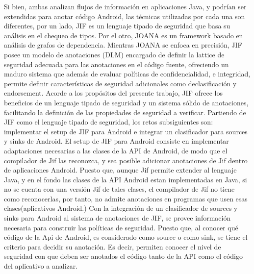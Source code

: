 Si bien, ambas analizan flujos de información en aplicaciones Java, y
podrían ser extendidas para anotar código Android, las técnicas utilizadas por cada una
son diferentes, por un lado, JIF es un lenguaje tipado de seguridad que basa su
análisis en el chequeo de tipos. Por el otro, JOANA es un framework basado en
análisis de grafos de dependencia. Mientras JOANA se enfoca en precisión, JIF
posee un modelo de anotaciones (DLM) encargado de definir la lattice de
seguridad adecuada para las anotaciones en el código fuente, ofreciendo un
maduro sistema que además de evaluar políticas de confidencialidad, e
integridad, permite definir características de seguridad adicionales como
declasificación y endorsement.
Acorde a los propósitos del presente trabajo, JIF ofrece los beneficios de un
lenguaje tipado de seguridad y un sistema  sólido  de anotaciones, facilitando
la definición de las propiedades de seguridad a verificar.\newline 
Partiendo de JIF como el lenguaje tipado de seguridad, los retos subsiguientes
son: implementar el setup de JIF para Android e integrar un clasificador
para sources y sinks de Android. 
El setup de JIF para Android consiste en implementar adaptaciones necesarias
a las clases de la API de Android, de modo que el compilador de Jif las
reconozca, y sea posible adicionar anotaciones de Jif dentro de aplicaciones
Android. Puesto que, aunque Jif permite extender al lenguaje Java, y en el fondo
las clases de la API Android estan implementadas en Java, si no se cuenta con
una versión Jif de tales clases, el compilador de Jif no tiene como
reconocerlas, por tanto, no admite anotaciones en programas que usen esas
clases(aplicativos Android.)\newline
Con la integración de un clasificador de sources y sinks para Android al sistema
de anotaciones de JIF, se provee información necesaria para construir las
políticas de seguridad. Puesto que, al conocer qué código de la Api de Android,
es considerado como source o como sink, se tiene el criterio para decidir su
anotación. Es decir, permiten conocer el nivel de seguridad con que deben ser
anotados el código tanto de la API como el código del aplicativo a
analizar.\newline
